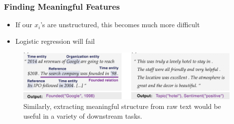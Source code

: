 \documentclass[10pt,mathserif]{beamer}
\begin{document}
\begin{frame}
  \frametitle{Finding Meaningful Features}
 \begin{itemize}
 \item If our $x_i$'s are unstructured, this becomes much more difficult
 \item Logistic regression will fail
 \end{itemize}
 \begin{figure}[ht]
   \centering
   \includegraphics[width=0.7\paperwidth]{figure/language_features}
   \caption{Similarly, extracting meaningful structure from raw text would be
     useful in a variety of downstream tasks. \label{fig:language_features} }
 \end{figure}
\end{frame}
\end{document}
